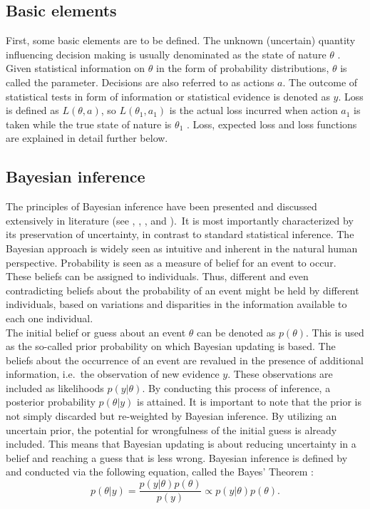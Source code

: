 	    \subsection{Basic elements}
	    First, some basic elements are to be defined. The unknown (uncertain) quantity influencing decision making is usually denominated as the state of nature $\theta$ \citep{berger2013stat}. Given statistical information on $\theta$ in the form of probability distributions, $\theta$ is called the parameter. 
	    Decisions are also referred to as actions $a$.
	    The outcome of statistical tests in form of information or statistical evidence is denoted as $y$.	    
	    Loss is defined as $L(\theta,a)$, so $L(\theta_1,a_1)$ is the actual loss incurred when action $a_1$ is taken while the true state of nature is $\theta_1$ \citep{berger2013stat}. Loss, expected loss and loss functions are explained in detail further below.  
        
        \subsection{Bayesian inference}
        The principles of Bayesian inference have been presented and discussed extensively in literature (see \citet{jaynes2003probability}, \citet{box2011bayesian}, \citet{harney2013bayesian}, \citet{gelman2014bayesian} and \citet{davidson2015}).\ It is most importantly characterized by its preservation of uncertainty, in contrast to standard statistical inference. The Bayesian approach is widely seen as intuitive and inherent in the natural human perspective. Probability is seen as a measure of belief for an event to occur. These beliefs can be assigned to individuals. Thus, different and even contradicting beliefs about the probability of an event might be held by different individuals, based on variations and disparities in the information available to each one individual.\\
        The initial belief or guess about an event $\theta$ can be denoted as $p(\theta)$. This is used as the so-called prior probability on which Bayesian updating is based. The beliefs about the occurrence of an event are revalued in the presence of additional information, i.e.\ the observation of new evidence $y$. These observations are included as likelihoods $p(y|\theta)$. By conducting this process of inference, a posterior probability $p(\theta|y)$ is attained. It is important to note that the prior is not simply discarded but re-weighted by Bayesian inference. By utilizing an uncertain prior, the potential for wrongfulness of the initial guess is already included. This means that Bayesian updating is about reducing uncertainty in a belief and reaching a guess that is less wrong. Bayesian inference is defined by and conducted via the following equation, called the Bayes' Theorem \citep{jaynes2003probability, gelman2014bayesian, box2011bayesian, harney2013bayesian, davidson2015}:
        \begin{equation}\label{eq:BayesTheorem}
        p(\theta|y) = \frac{p(y|\theta)p(\theta)}{p(y)}
        \propto p(y|\theta)p(\theta).
        \end{equation}
                
